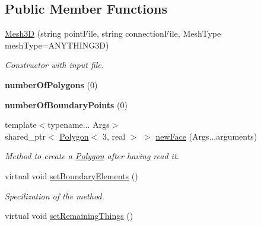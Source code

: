 \subsection*{\-Public \-Member \-Functions}
\begin{DoxyCompactItemize}
\item 
\hypertarget{class_mesh3_d_ab5b158493bd041915b32ff7c17570a8e}{\hyperlink{class_mesh3_d_ab5b158493bd041915b32ff7c17570a8e}{\-Mesh3\-D} (string point\-File, string connection\-File, \-Mesh\-Type mesh\-Type=\-A\-N\-Y\-T\-H\-I\-N\-G3\-D)}\label{class_mesh3_d_ab5b158493bd041915b32ff7c17570a8e}

\begin{DoxyCompactList}\small\item\em \-Constructor with input file. \end{DoxyCompactList}\item 
\hypertarget{class_mesh3_d_abbc268d8c9008d4d2b83bc684530764e}{{\bfseries number\-Of\-Polygons} (0)}\label{class_mesh3_d_abbc268d8c9008d4d2b83bc684530764e}

\item 
\hypertarget{class_mesh3_d_ae7bd0fd5fc65d2217a2cdb2180fa55f7}{{\bfseries number\-Of\-Boundary\-Points} (0)}\label{class_mesh3_d_ae7bd0fd5fc65d2217a2cdb2180fa55f7}

\item 
{\footnotesize template$<$typename... \-Args$>$ }\\shared\-\_\-ptr$<$ \hyperlink{class_polygon}{\-Polygon}$<$ 3, real $>$ $>$ \hyperlink{class_mesh3_d_a34d811780e44e448dc45f7142078a1d0}{new\-Face} (\-Args...\-arguments)
\begin{DoxyCompactList}\small\item\em \-Method to create a \hyperlink{class_polygon}{\-Polygon} after having read it. \end{DoxyCompactList}\item 
virtual void \hyperlink{class_mesh3_d_a5c90136ef98ac86c4bbd51eaa6c9b811}{set\-Boundary\-Elements} ()
\begin{DoxyCompactList}\small\item\em \-Specilization of the method. \end{DoxyCompactList}\item 
\hypertarget{class_mesh3_d_ab13f81c133cff51c5e386db23c5ec685}{virtual void \hyperlink{class_mesh3_d_ab13f81c133cff51c5e386db23c5ec685}{set\-Remaining\-Things} ()}\label{class_mesh3_d_ab13f81c133cff51c5e386db23c5ec685}


\end{DoxyCompactItemize}
